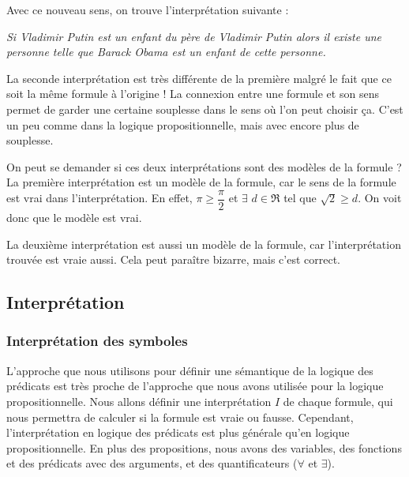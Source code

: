 Avec ce nouveau sens, on trouve l'interprétation suivante : 
\begin{center}
\textit{Si Vladimir Putin est un enfant du père de Vladimir Putin alors il existe une personne telle que Barack Obama est un enfant de cette personne.}
\end{center}
La seconde interprétation est très différente de la première malgré le fait que ce soit la même formule à l'origine ! La connexion entre une formule et son sens permet de garder une certaine souplesse dans le sens où l'on peut choisir ça. C'est un peu comme dans la logique propositionnelle, mais avec encore plus de souplesse.

On peut se demander si ces deux interprétations sont des modèles de la formule ? \\
La première interprétation est un modèle de la formule, car le sens de la formule est vrai dans l'interprétation. En effet, $\pi \geq \dfrac{\pi}{2}$ et $\exists$ $ d \in \Re$ tel que $\sqrt2 \geq d$. On voit donc que le modèle est vrai.

La deuxième interprétation est aussi un modèle de la formule, car l'interprétation trouvée est vraie aussi. Cela peut paraître bizarre, mais c'est correct. 

\subsection{Interprétation}

\subsubsection{Interprétation des symboles}

L'approche que nous utilisons pour définir une sémantique de la logique des prédicats est très proche 
de l'approche que nous avons utilisée pour la logique propositionnelle.
Nous allons définir une interprétation $I$ de chaque formule, qui nous permettra de calculer si la formule est vraie ou fausse.
Cependant, l'interprétation en logique des prédicats est plus générale qu'en logique propositionnelle.
En plus des propositions, nous avons des variables, des fonctions et des prédicats avec des arguments,
et des quantificateurs ($\forall$ et $\exists$).

